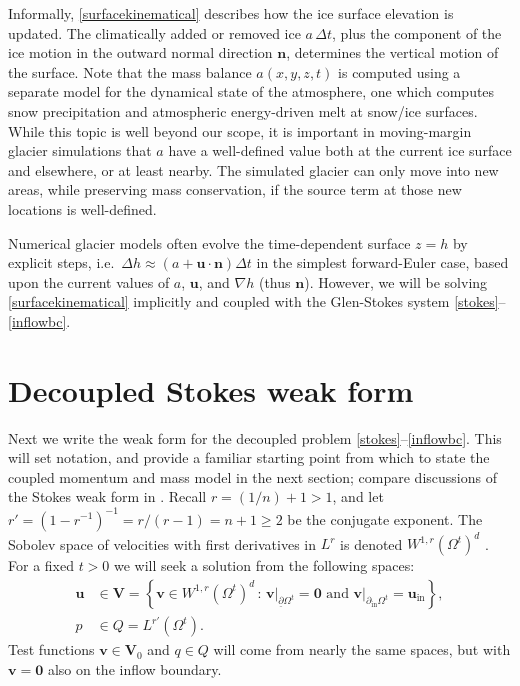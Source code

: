 \documentclass[letterpaper,final,12pt,reqno]{amsart}
\newcommand{\grad}{\nabla}
\newcommand{\bn}{\mathbf{n}}
\newcommand{\bu}{\mathbf{u}}
\newcommand{\bv}{\mathbf{v}}
\newcommand{\bV}{\mathbf{V}}
\newcommand{\bzero}{\bm{0}}
\begin{document}
Informally, \eqref{surfacekinematical} describes how the ice surface elevation is updated.  The climatically added or removed ice $a\,\Delta t$, plus the component of the ice motion in the outward normal direction $\bn$, determines the vertical motion of the surface.  Note that the mass balance $a(x,y,z,t)$ is computed using a separate model for the dynamical state of the atmosphere, one which computes snow precipitation and atmospheric energy-driven melt at snow/ice surfaces.  While this topic is well beyond our scope, it is important in moving-margin glacier simulations that $a$ have a well-defined value both at the current ice surface and elsewhere, or at least nearby.  The simulated glacier can only move into new areas, while preserving mass conservation, if the source term at those new locations is well-defined.

Numerical glacier models often evolve the time-dependent surface $z=h$ by explicit steps, i.e.~$\Delta h \approx \left(a + \bu\cdot \bn\right) \Delta t$ in the simplest forward-Euler case, based upon the current values of $a$, $\bu$, and $\grad h$ (thus $\bn$).  However, we will be solving \eqref{surfacekinematical} implicitly and coupled with the Glen-Stokes system \eqref{stokes}--\eqref{inflowbc}.


\section{Decoupled Stokes weak form} \label{sec:weakstokes}

Next we write the weak form for the decoupled problem \eqref{stokes}--\eqref{inflowbc}.  This will set notation, and provide a familiar starting point from which to state the coupled momentum and mass model in the next section; compare discussions of the Stokes weak form in  \cite{Bueler2021,Elmanetal2014,JouvetRappaz2011}.  Recall $r=(1/n) + 1>1$, and let $r'=(1-r^{-1})^{-1}=r/(r-1)=n+1\ge 2$ be the conjugate exponent.  The Sobolev space of velocities with first derivatives in $L^r$ is denoted $W^{1,r}(\Omega^t)^d$ \cite{Evans2010}.  For a fixed $t>0$ we will seek a solution from the following spaces:
\begin{align*}
\bu &\in \bV = \left\{\bv \in W^{1,r}(\Omega^t)^d\,:\,\bv\big|_{\underline{\partial} \Omega^t}=\bzero \text{ and } \bv\big|_{\partial_{\text{in}} \Omega^t} = \bu_{\text{in}}\right\}, \\
p &\in Q = L^{r'}(\Omega^t).
\end{align*}
Test functions $\bv \in \bV_0$ and $q\in Q$ will come from nearly the same spaces, but with $\bv=\bzero$ also on the inflow boundary.
\end{document}
